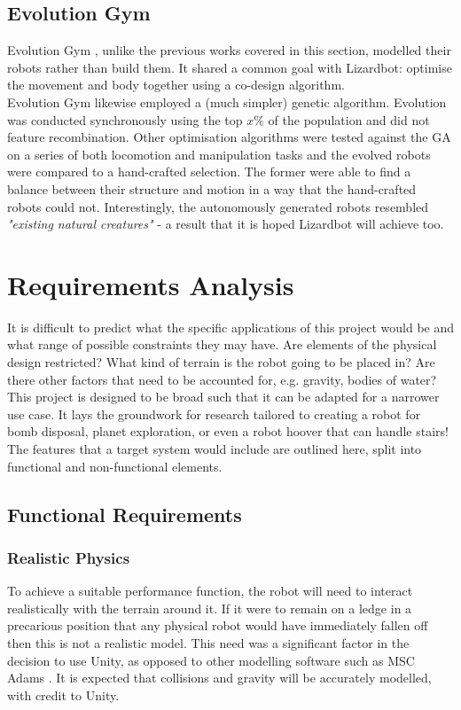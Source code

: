 \documentclass{article}
\begin{document}
\subsection{Evolution Gym}
\label{sec:Evolution Gym}
Evolution Gym , unlike the previous works covered in this section, modelled their robots rather than build them. It shared a common goal with Lizardbot: optimise the movement and body together using a co-design algorithm. \\
Evolution Gym likewise employed a (much simpler) genetic algorithm. Evolution was conducted synchronously using the top $x\%$ of the population and did not feature recombination. Other optimisation algorithms were tested against the GA on a series of both locomotion and manipulation tasks and the evolved robots were compared to a hand-crafted selection. The former were able to find a balance between their structure and motion in a way that the hand-crafted robots could not. Interestingly, the autonomously generated robots resembled \textit{"existing natural creatures"} - a result that it is hoped Lizardbot will achieve too.

\newpage
\section{Requirements Analysis}
\label{sec:Requirements Analysis}
It is difficult to predict what the specific applications of this project would be and what range of possible constraints they may have. Are elements of the physical design restricted? What kind of terrain is the robot going to be placed in? Are there other factors that need to be accounted for, e.g. gravity, bodies of water? This project is designed to be broad such that it can be adapted for a narrower use case. It lays the groundwork for research tailored to creating a robot for bomb disposal, planet exploration, or even a robot hoover that can handle stairs!
The features that a target system would include are outlined here, split into functional and non-functional elements.

\subsection{Functional Requirements}
\label{sec:Functional Requirements}
\subsubsection{Realistic Physics}
\label{sec:Realistic Physics}
To achieve a suitable performance function, the robot will need to interact realistically with the terrain around it. If it were to remain on a ledge in a precarious position that any physical robot would have immediately fallen off then this is not a realistic model. 
This need was a significant factor in the decision to use Unity, as opposed to other modelling software such as MSC Adams . It is expected that collisions and gravity will be accurately modelled, with credit to Unity.
\end{document}
